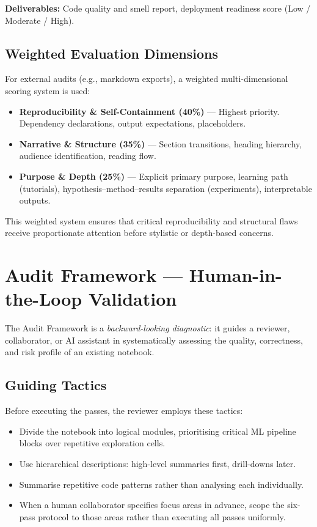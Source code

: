 \documentclass[11pt, a4paper]{article}
\begin{document}
\textbf{Deliverables:} Code quality and smell report, deployment readiness
score (Low / Moderate / High).

\subsection*{Weighted Evaluation Dimensions}

For external audits (e.g., markdown exports), a weighted multi-dimensional
scoring system is used:

\begin{itemize}
  \item \textbf{Reproducibility \& Self-Containment (40\%)} — Highest
    priority. Dependency declarations, output expectations, placeholders.
  \item \textbf{Narrative \& Structure (35\%)} — Section transitions, heading
    hierarchy, audience identification, reading flow.
  \item \textbf{Purpose \& Depth (25\%)} — Explicit primary purpose, learning
    path (tutorials), hypothesis--method--results separation (experiments),
    interpretable outputs.
\end{itemize}

This weighted system ensures that critical reproducibility and structural
flaws receive proportionate attention before stylistic or depth-based
concerns.

\section{Audit Framework — Human-in-the-Loop Validation}
\label{sec:audit}

The Audit Framework is a \textit{backward-looking diagnostic}: it guides a
reviewer, collaborator, or AI assistant in systematically assessing the
quality, correctness, and risk profile of an existing notebook.

\subsection*{Guiding Tactics}

Before executing the passes, the reviewer employs these tactics:

\begin{itemize}
  \item Divide the notebook into logical modules, prioritising critical ML
    pipeline blocks over repetitive exploration cells.
  \item Use hierarchical descriptions: high-level summaries first, drill-downs
    later.
  \item Summarise repetitive code patterns rather than analysing each
    individually.
  \item When a human collaborator specifies focus areas in advance, scope the
    six-pass protocol to those areas rather than executing all passes
    uniformly.
\end{itemize}
\end{document}
